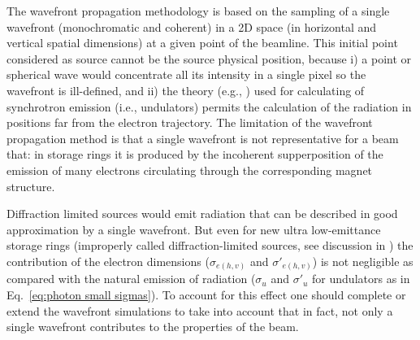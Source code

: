 \documentclass{iucr}              %
\begin{document}
The wavefront propagation methodology is based on the sampling of a single wavefront (monochromatic and coherent) in a 2D space (in horizontal and vertical spatial dimensions) at a given point of the beamline. This initial point considered as source cannot be the source physical position, because i) a point or spherical wave would concentrate all its intensity in a single pixel so the wavefront is ill-defined, and ii) the theory (e.g., \cite{jackson}) used for calculating of  synchrotron emission (i.e., undulators) permits the calculation of the radiation in positions far from the electron trajectory. The limitation of the wavefront propagation method is that a single wavefront is not representative for a beam that: in storage rings it is produced by the incoherent supperposition of the emission of many electrons circulating through the corresponding magnet structure. 

Diffraction limited sources would emit radiation that can be described in good approximation by a single wavefront. But even for new ultra low-emittance storage rings (improperly called diffraction-limited sources, see discussion in \cite{arxivCF}) the contribution of the electron dimensions ($\sigma_{e(h,v)}$ and $\sigma'_{e(h,v)}$) is not negligible as compared with the natural emission of radiation ($\sigma_u$ and $\sigma'_u$ for undulators as in Eq.~\ref{eq:photon small sigmas}). To account for this effect one should complete or extend the wavefront simulations to take into account that in fact, not only a single wavefront contributes to the properties of the beam. 
\end{document}
